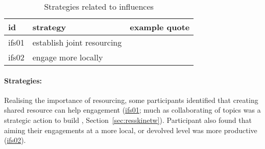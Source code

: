 \begin{table}[!ht]
\footnotesize
\caption{Strategies related to \skiinfr{} influences}\label{tab:resskiinfrstrat}
\begin{tabular}{L{.06\linewidth}L{.3\linewidth}L{.64\linewidth}} \hline
\textbf{id} & \textbf{strategy} & \textbf{example quote} \\ \hline \hline
ifs01 & establish joint resourcing &  \\[5mm]
ifs02 & engage more locally &  \\[5mm]
\hline
 \end{tabular}
\end{table}

\paragraph{Strategies:}
Realising the importance of resourcing, some participants identified that creating shared resource can help engagement (\hyperref[tab:resskiinfrstrat]{ifs01}; much as collaborating of topics was a strategic action to build \skinetw, Section~\ref{sec:resskinetw}). Participant also found that aiming their engagements at a more local, or devolved level was more productive (\hyperref[tab:resskiinfrstrat]{ifs02}).

\subsubsection{\titeven}\label{sec:resskieven}

